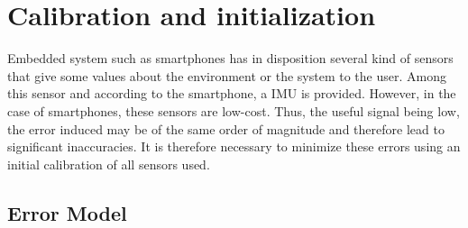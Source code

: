 \section{Calibration and initialization}



Embedded system such as smartphones has in disposition several kind of sensors that give some values about the environment or the system to the user. Among this sensor and according to the smartphone, a IMU is provided. However, in the case of smartphones, these sensors are low-cost. Thus, the useful signal being low, the error induced may be of the same order of magnitude and therefore lead to significant inaccuracies. It is therefore necessary to minimize these errors using an initial calibration of all sensors used.

	

\subsection{Error Model}


